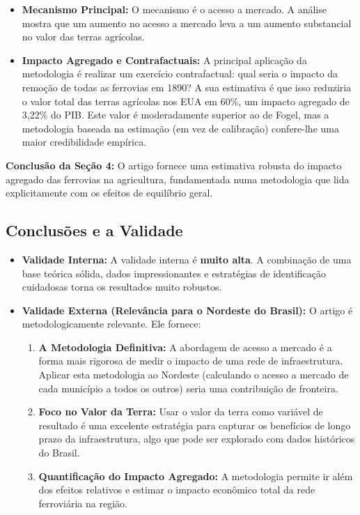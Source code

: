 \documentclass[12pt, a4paper]{article}
\begin{document}
\begin{itemize}
    \item \textbf{Mecanismo Principal:} O mecanismo é o acesso a mercado. A análise mostra que um aumento no acesso a mercado leva a um aumento substancial no valor das terras agrícolas.
    \item \textbf{Impacto Agregado e Contrafactuais:} A principal aplicação da metodologia é realizar um exercício contrafactual: qual seria o impacto da remoção de todas as ferrovias em 1890? A sua estimativa é que isso reduziria o valor total das terras agrícolas nos EUA em 60\%, um impacto agregado de 3,22\% do PIB. Este valor é moderadamente superior ao de Fogel, mas a metodologia baseada na estimação (em vez de calibração) confere-lhe uma maior credibilidade empírica.
\end{itemize}

\noindent\textbf{Conclusão da Seção 4:} O artigo fornece uma estimativa robusta do impacto agregado das ferrovias na agricultura, fundamentada numa metodologia que lida explicitamente com os efeitos de equilíbrio geral.

\subsection{Conclusões e a Validade}
\begin{itemize}
    \item \textbf{Validade Interna:} A validade interna é \textbf{muito alta}. A combinação de uma base teórica sólida, dados impressionantes e estratégias de identificação cuidadosas torna os resultados muito robustos.
    \item \textbf{Validade Externa (Relevância para o Nordeste do Brasil):} O artigo é metodologicamente relevante. Ele fornece:
        \begin{enumerate}
            \item \textbf{A Metodologia Definitiva:} A abordagem de acesso a mercado é a forma mais rigorosa de medir o impacto de uma rede de infraestrutura. Aplicar esta metodologia ao Nordeste (calculando o acesso a mercado de cada município a todos os outros) seria uma contribuição de fronteira.
            \item \textbf{Foco no Valor da Terra:} Usar o valor da terra como variável de resultado é uma excelente estratégia para capturar os benefícios de longo prazo da infraestrutura, algo que pode ser explorado com dados históricos do Brasil.
            \item \textbf{Quantificação do Impacto Agregado:} A metodologia permite ir além dos efeitos relativos e estimar o impacto econômico total da rede ferroviária na região.
        \end{enumerate}
\end{itemize}
\end{document}

